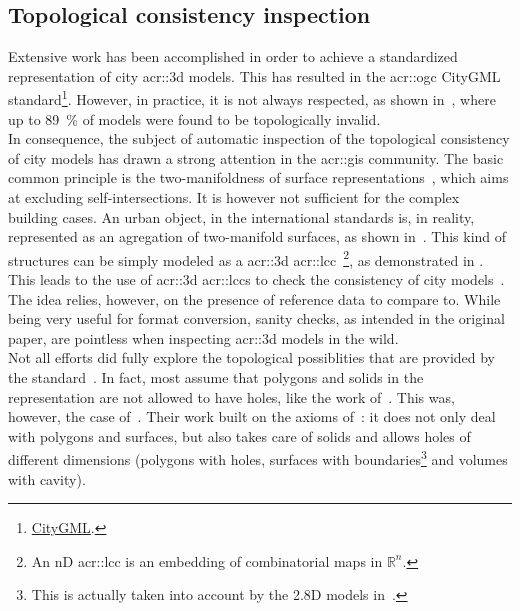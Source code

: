     \subsection{Topological consistency inspection}
        \label{subsec::introduction::building_model_evaluation::topological}
        Extensive work has been accomplished in order to achieve a standardized representation of city \gls{acr::3d} models.
        This has resulted in the \gls{acr::ogc} CityGML standard\footnote{\href{https://www.opengeospatial.org/standards/citygml}{CityGML}.}.
        However, in practice, it is not always respected, as shown in~\textcite{biljecki2016most}, where up to \SI{89}{\percent} of models were found to be topologically invalid.\\

        In consequence, the subject of automatic inspection of the topological consistency of city models has drawn a strong attention in the \gls{acr::gis} community.
        The basic common principle is the two-manifoldness of surface representations~\parencite{groger2011achieve}, which aims at excluding self-intersections.
        It is however not sufficient for the complex building cases.
        An urban object, in the international standards is, in reality, represented as an agregation of two-manifold surfaces, as shown in~\textcite{groger2011achieve, ledoux2013validation}.
        This kind of structures can be simply modeled as a \gls{acr::3d} \gls{acr::lcc}~\parencite{damiand2014combinatorial}\footnote{
            An nD \gls{acr::lcc} is an embedding of combinatorial maps in \(\mathbb{R}^n\).
        }, as demonstrated in \textcite{diakite2014topological}.
        This leads to the use of \gls{acr::3d} \glspl{acr::lcc} to check the consistency of city models~\parencite{gorszczyk2016automatic}.
        The idea relies, however, on the presence of reference data to compare to.
        While being very useful for format conversion, sanity checks, as intended in the original paper, are pointless when inspecting \gls{acr::3d} models in the wild.\\
        Not all efforts did fully explore the topological possiblities that are provided by the standard~\parencite{ledoux2013validation,biljecki2016most}.
        In fact, most assume that polygons and solids in the representation are not allowed to have holes, like the work of~\textcite{groger2011achieve, alam2014towards}.
        This was, however, the case of~\textcite{ledoux2013validation}.
        Their work built on the axioms of~\textcite{groger2011achieve}: it does not only deal with polygons and surfaces, but also takes care of solids and allows holes of different dimensions (polygons with holes, surfaces with boundaries\footnote{
            This is actually taken into account by the 2.8D models in~\textcite{groger2011achieve}.
        } and volumes with cavity).
